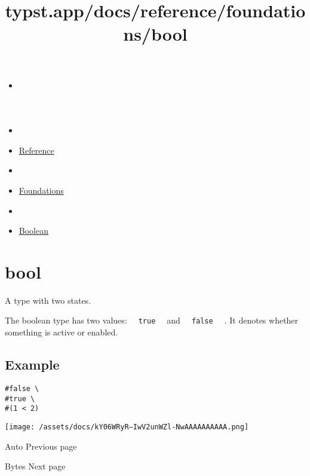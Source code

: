 \title{typst.app/docs/reference/foundations/bool}

\begin{itemize}
\tightlist
\item
  \href{/docs}{}
\item
  
\item
  \href{/docs/reference/}{Reference}
\item
  
\item
  \href{/docs/reference/foundations/}{Foundations}
\item
  
\item
  \href{/docs/reference/foundations/bool/}{Boolean}
\end{itemize}

\section{\texorpdfstring{{ bool }}{ bool }}\label{summary}

A type with two states.

The boolean type has two values:
\texttt{\ }{\texttt{\ true\ }}\texttt{\ } and
\texttt{\ }{\texttt{\ false\ }}\texttt{\ } . It denotes whether
something is active or enabled.

\subsection{Example}\label{example}

\begin{verbatim}
#false \
#true \
#(1 < 2)
\end{verbatim}

\texttt{[image: /assets/docs/kY06WRyR--IwV2unWZl-NwAAAAAAAAAA.png]}

\href{/docs/reference/foundations/auto/}{\pandocbounded{}}

{ Auto } { Previous page }

\href{/docs/reference/foundations/bytes/}{\pandocbounded{}}

{ Bytes } { Next page }
